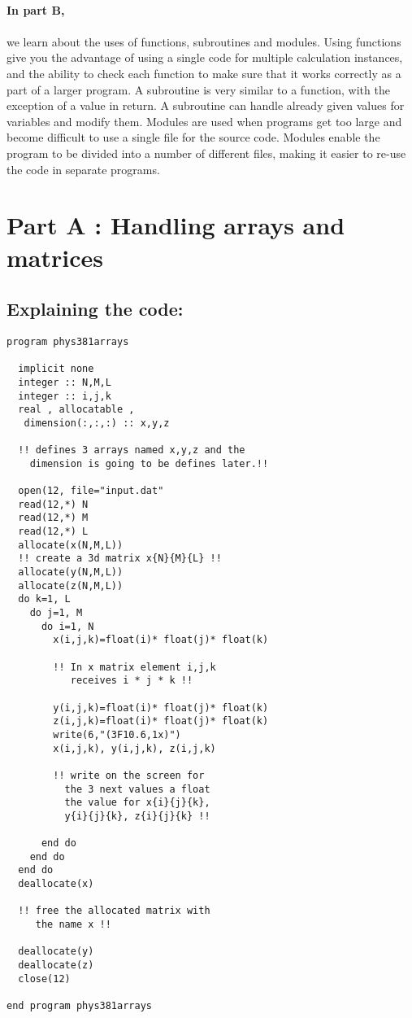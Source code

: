 \documentclass[twocolumn]{article}
\begin{document}
\paragraph*{In part B,\\}
\paragraph*{}
we learn about the uses of functions, subroutines and modules. Using functions give you the advantage of using a single code for multiple calculation instances, and the ability to check each function to make sure that it works correctly as a part of a larger program. A subroutine is very similar to a function, with the exception of a value in return. A subroutine can handle already given values for variables and modify them. Modules are used when programs get too large and become difficult to use a single file for the source code. Modules enable the program to be divided into a number of different files, making it easier to re-use the code in separate programs.
\section{Part A : Handling arrays and matrices}

\subsection{Explaining the code:}

\begin{verbatim}
program phys381arrays

  implicit none
  integer :: N,M,L
  integer :: i,j,k
  real , allocatable ,
   dimension(:,:,:) :: x,y,z 
   
  !! defines 3 arrays named x,y,z and the 
    dimension is going to be defines later.!!

  open(12, file="input.dat"
  read(12,*) N 
  read(12,*) M 
  read(12,*) L 
  allocate(x(N,M,L))
  !! create a 3d matrix x{N}{M}{L} !!
  allocate(y(N,M,L)) 
  allocate(z(N,M,L)) 
  do k=1, L
    do j=1, M
      do i=1, N
        x(i,j,k)=float(i)* float(j)* float(k) 
        
        !! In x matrix element i,j,k 
           receives i * j * k !!         
           
        y(i,j,k)=float(i)* float(j)* float(k) 
        z(i,j,k)=float(i)* float(j)* float(k) 
        write(6,"(3F10.6,1x)")
        x(i,j,k), y(i,j,k), z(i,j,k) 
        
        !! write on the screen for
          the 3 next values a float
          the value for x{i}{j}{k},
          y{i}{j}{k}, z{i}{j}{k} !!
          
      end do
    end do
  end do
  deallocate(x) 
  
  !! free the allocated matrix with 
     the name x !!
     
  deallocate(y) 
  deallocate(z) 
  close(12)

end program phys381arrays
\end{verbatim}
\end{document}

